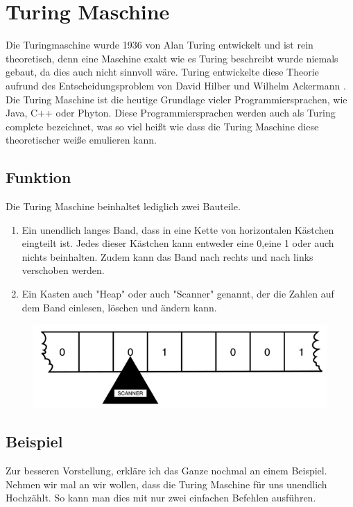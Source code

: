 \section{Turing Maschine}
Die Turingmaschine wurde 1936 von Alan Turing entwickelt und ist rein theoretisch, denn eine Maschine exakt wie es Turing beschreibt wurde niemals gebaut, da dies auch nicht sinnvoll wäre. Turing entwickelte diese Theorie aufrund des Entscheidungsproblem von David Hilber und Wilhelm Ackermann \cite{theessentialturing}. Die Turing Maschine ist die heutige Grundlage vieler Programmiersprachen, wie Java, C++ oder Phyton. Diese Programmiersprachen werden auch als Turing complete bezeichnet, was so viel heißt wie dass die Turing Maschine diese theoretischer weiße emulieren kann.

\subsection{Funktion} 
Die Turing Maschine beinhaltet lediglich zwei Bauteile.
\begin{enumerate}
\item  Ein unendlich langes Band, dass in eine Kette von horizontalen Kästchen eingteilt ist. Jedes dieser Kästchen kann entweder eine 0,eine 1 oder auch nichts beinhalten. Zudem kann das Band nach rechts und nach links verschoben werden.
\item Ein Kasten auch "Heap" oder auch "Scanner" genannt, der die Zahlen auf dem Band einlesen, löschen und ändern kann.
\end{enumerate}
 
\begin{figure}[hbtp]
\centering
\includegraphics[scale=1]{TuringmashinePicture.png}
\caption{\cite{theessentialturing}}
\end{figure}




\subsection{Beispiel} Zur besseren Vorstellung, erkläre ich das Ganze nochmal an einem Beispiel. Nehmen wir mal an wir wollen, dass die Turing Maschine für uns unendlich Hochzählt. So kann man dies mit nur zwei einfachen Befehlen ausführen. 

